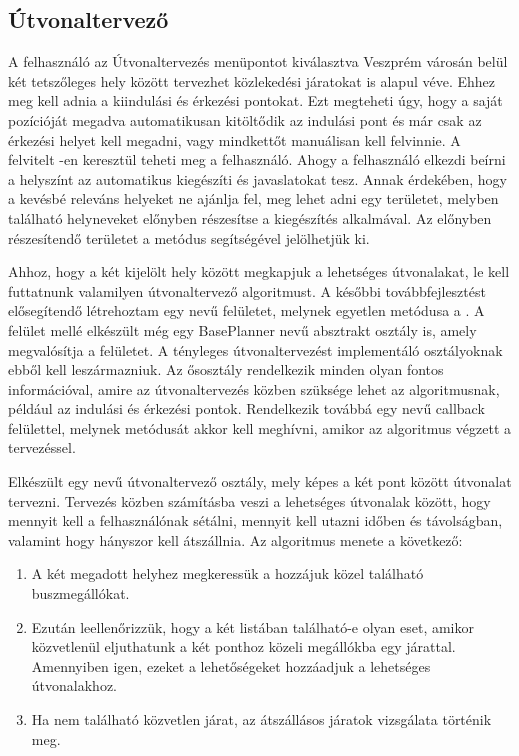 \subsection*{Útvonaltervező}
\label{planner}
A felhasználó az Útvonaltervezés menüpontot kiválasztva Veszprém városán belül két tetszőleges hely között tervezhet közlekedési járatokat is alapul véve.
Ehhez meg kell adnia a kiindulási és érkezési pontokat.
Ezt megteheti úgy, hogy a saját pozícióját megadva automatikusan kitöltődik az indulási pont és már csak az érkezési helyet kell megadni, vagy mindkettőt manuálisan kell felvinnie.
A felvitelt -en keresztül teheti meg a felhasználó.
Ahogy a felhasználó elkezdi beírni a helyszínt az  automatikus kiegészíti és javaslatokat tesz.
Annak érdekében, hogy a kevésbé releváns helyeket ne ajánlja fel, meg lehet adni egy területet, melyben található helyneveket előnyben részesítse a kiegészítés alkalmával.
Az előnyben részesítendő területet a  metódus segítségével jelölhetjük ki.

Ahhoz, hogy a két kijelölt hely között megkapjuk a lehetséges útvonalakat, le kell futtatnunk valamilyen útvonaltervező algoritmust.
A későbbi továbbfejlesztést elősegítendő létrehoztam egy  nevű felületet, melynek egyetlen metódusa a .
A felület mellé elkészült még egy BasePlanner nevű absztrakt osztály is, amely megvalósítja a felületet.
A tényleges útvonaltervezést implementáló osztályoknak ebből kell leszármazniuk.
Az ősosztály rendelkezik minden olyan fontos információval, amire az útvonaltervezés közben szüksége lehet az algoritmusnak, például az indulási és érkezési pontok. 
Rendelkezik továbbá egy  nevű callback felülettel, melynek  metódusát akkor kell meghívni, amikor az algoritmus végzett a tervezéssel.

Elkészült egy  nevű útvonaltervező osztály, mely képes a két pont között útvonalat tervezni.
Tervezés közben számításba veszi a lehetséges útvonalak között, hogy mennyit kell a felhasználónak sétálni, mennyit kell utazni időben és távolságban, valamint hogy hányszor kell átszállnia.
Az algoritmus menete a következő:
\begin{enumerate}
	\item A két megadott helyhez megkeressük a hozzájuk közel található buszmegállókat.
	\item Ezután leellenőrizzük, hogy a két listában található-e olyan eset, amikor közvetlenül eljuthatunk a két ponthoz közeli megállókba egy járattal. 
	Amennyiben igen, ezeket a lehetőségeket hozzáadjuk a lehetséges útvonalakhoz.
	\item Ha nem található közvetlen járat, az átszállásos járatok vizsgálata történik meg.
\end{enumerate}

